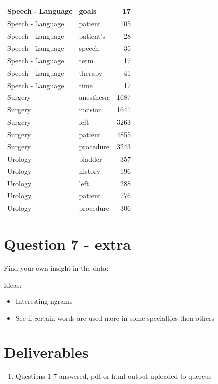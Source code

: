 \documentclass[
]{article}
\providecommand{\tightlist}{%
  \setlength{\itemsep}{0pt}\setlength{\parskip}{0pt}}
\begin{document}
\begin{table}
\begin{tabular}{l|l|r}
\hline
Speech - Language & goals & 17\\
\hline
Speech - Language & patient & 105\\
\hline
Speech - Language & patient's & 28\\
\hline
Speech - Language & speech & 35\\
\hline
Speech - Language & term & 17\\
\hline
Speech - Language & therapy & 41\\
\hline
Speech - Language & time & 17\\
\hline
Surgery & anesthesia & 1687\\
\hline
Surgery & incision & 1641\\
\hline
Surgery & left & 3263\\
\hline
Surgery & patient & 4855\\
\hline
Surgery & procedure & 3243\\
\hline
Urology & bladder & 357\\
\hline
Urology & history & 196\\
\hline
Urology & left & 288\\
\hline
Urology & patient & 776\\
\hline
Urology & procedure & 306\\
\hline
\end{tabular}
\end{table}

\hypertarget{question-7---extra}{%
\section{Question 7 - extra}\label{question-7---extra}}

Find your own insight in the data:

Ideas:

\begin{itemize}
\tightlist
\item
  Interesting ngrams
\item
  See if certain words are used more in some specialties then others
\end{itemize}

\hypertarget{deliverables}{%
\section{Deliverables}\label{deliverables}}

\begin{enumerate}
\def\labelenumi{\arabic{enumi}.}
\tightlist
\item
  Questions 1-7 answered, pdf or html output uploaded to quercus
\end{enumerate}
\end{document}
